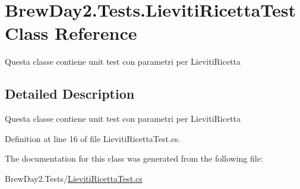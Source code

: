 \hypertarget{class_brew_day2_1_1_tests_1_1_lieviti_ricetta_test}{}\section{Brew\+Day2.\+Tests.\+Lieviti\+Ricetta\+Test Class Reference}
\label{class_brew_day2_1_1_tests_1_1_lieviti_ricetta_test}


Questa classe contiene unit test con parametri per Lieviti\+Ricetta 




\subsection{Detailed Description}
Questa classe contiene unit test con parametri per Lieviti\+Ricetta



Definition at line 16 of file Lieviti\+Ricetta\+Test.\+cs.



The documentation for this class was generated from the following file\+:\begin{DoxyCompactItemize}
\item 
Brew\+Day2.\+Tests/\mbox{\hyperlink{_lieviti_ricetta_test_8cs}{Lieviti\+Ricetta\+Test.\+cs}}\end{DoxyCompactItemize}
